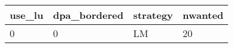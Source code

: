 \begin{tabular}{llll}
use_lu & dpa_bordered & strategy & nwanted \\ 
\hline 
0 & 0 & LM & 20 \\ 
\hline 
\end{tabular}